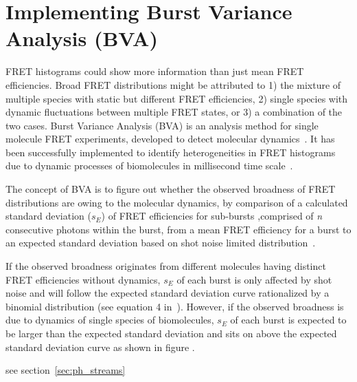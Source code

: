 \section{Implementing Burst Variance Analysis (BVA)}

FRET histograms could show more information than just mean FRET efficiencies. Broad FRET distributions might be attributed to 1) the mixture of multiple species with static but different FRET efficiencies, 2) single species with dynamic fluctuations between multiple FRET states, or 3) a combination of the two cases. Burst Variance Analysis (BVA) is an analysis method for single molecule FRET experiments, developed to detect molecular dynamics~\cite{Torella_2011}. It has been successfully implemented to identify heterogeneities in FRET histograms due to dynamic processes of biomolecules in millisecond time scale~\cite{Torella_2011, Robb_2013}.

The concept of BVA is to figure out whether the observed broadness of FRET distributions are owing to the molecular dynamics, by comparison of a calculated standard deviation ($s_E$) of FRET efficiencies for sub-bursts ,comprised of \textit{n} consecutive photons within the burst, from a mean FRET efficiency for a burst to an expected standard deviation based on shot noise limited distribution~\cite{Torella_2011}. 

If the observed broadness originates from different molecules having distinct FRET efficiencies without dynamics, $s_E$ of each burst is only affected by shot noise and will follow the expected standard deviation curve rationalized by a binomial distribution (see equation 4 in~\cite{Torella_2011}). However, if the observed broadness is due to dynamics of single species of biomolecules, $s_E$ of each burst is expected to be larger than the expected standard deviation and sits on above the expected standard deviation curve as shown in figure .  



see section~\ref{sec:ph_streams}